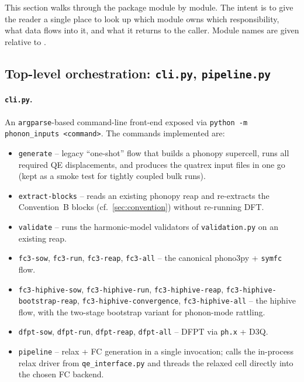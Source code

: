 This section walks through the package module by module.  The intent
is to give the reader a single place to look up which module owns
which responsibility, what data flows into it, and what it returns to
the caller.  Module names are given relative to
.

\subsection{Top-level orchestration: \texttt{cli.py}, \texttt{pipeline.py}}
\label{sec:pinputs_cli}

\paragraph{\texttt{cli.py}.}  An \texttt{argparse}-based command-line
front-end exposed via \texttt{python -m phonon\_inputs <command>}.  The
commands implemented are:

\begin{itemize}
  \item \texttt{generate} -- legacy ``one-shot'' flow that builds a
        phonopy supercell, runs all required QE displacements, and
        produces the quatrex input files in one go (kept as a smoke
        test for tightly coupled bulk runs).
  \item \texttt{extract-blocks} -- reads an existing phonopy reap and
        re-extracts the Convention~B blocks (cf.\
        \cref{sec:convention}) without re-running DFT.
  \item \texttt{validate} -- runs the harmonic-model validators of
        \texttt{validation.py} on an existing reap.
  \item \texttt{fc3-sow}, \texttt{fc3-run}, \texttt{fc3-reap},
        \texttt{fc3-all} -- the canonical phono3py + \texttt{symfc}
        flow.
  \item \texttt{fc3-hiphive-sow}, \texttt{fc3-hiphive-run},
        \texttt{fc3-hiphive-reap},
        \texttt{fc3-hiphive-bootstrap-reap},
        \texttt{fc3-hiphive-convergence},
        \texttt{fc3-hiphive-all} -- the hiphive flow, with the
        two-stage bootstrap variant for phonon-mode rattling.
  \item \texttt{dfpt-sow}, \texttt{dfpt-run}, \texttt{dfpt-reap},
        \texttt{dfpt-all} -- DFPT via \texttt{ph.x} + D3Q.
  \item \texttt{pipeline} -- relax + FC generation in a single
        invocation; calls the in-process relax driver from
        \texttt{qe\_interface.py} and threads the relaxed cell directly
        into the chosen FC backend.
\end{itemize}

